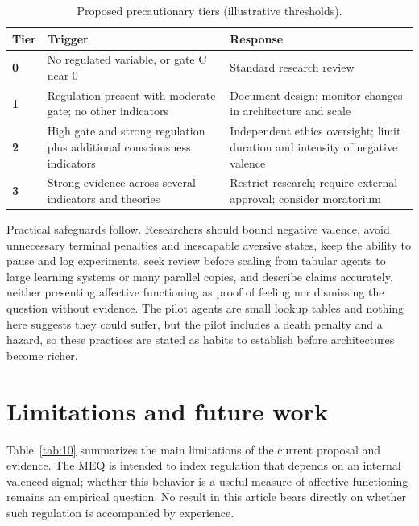 \documentclass[twoside,11pt]{article}
\begin{document}
\begin{table}[!htbp]
\centering
\caption{Proposed precautionary tiers (illustrative thresholds).}\label{tab:9}
\small
\renewcommand{\arraystretch}{1.2}
\begin{tabular}{>{\raggedright\arraybackslash}p{\dimexpr 0.0997\dimexpr\textwidth-6\tabcolsep\relax\relax}>{\raggedright\arraybackslash}p{\dimexpr 0.3767\dimexpr\textwidth-6\tabcolsep\relax\relax}>{\raggedright\arraybackslash}p{\dimexpr 0.5236\dimexpr\textwidth-6\tabcolsep\relax\relax}}
\toprule
\textbf{Tier} & \textbf{Trigger} & \textbf{Response} \\
\midrule
\textbf{0} & No regulated variable, or gate C near 0 & Standard research review \\
\textbf{1} & Regulation present with moderate gate; no other indicators & Document design; monitor changes in architecture and scale \\
\textbf{2} & High gate and strong regulation plus additional consciousness indicators & Independent ethics oversight; limit duration and intensity of negative valence \\
\textbf{3} & Strong evidence across several indicators and theories & Restrict research; require external approval; consider moratorium \\
\bottomrule
\end{tabular}
\end{table}

Practical safeguards follow. Researchers should bound negative valence, avoid unnecessary terminal penalties and inescapable aversive states, keep the ability to pause and log experiments, seek review before scaling from tabular agents to large learning systems or many parallel copies, and describe claims accurately, neither presenting affective functioning as proof of feeling nor dismissing the question without evidence. The pilot agents are small lookup tables and nothing here suggests they could suffer, but the pilot includes a death penalty and a hazard, so these practices are stated as habits to establish before architectures become richer.

\section{Limitations and future work}\label{sec:9}

Table~\ref{tab:10} summarizes the main limitations of the current proposal and evidence. The MEQ is intended to index regulation that depends on an internal valenced signal; whether this behavior is a useful measure of affective functioning remains an empirical question. No result in this article bears directly on whether such regulation is accompanied by experience.
\end{document}
